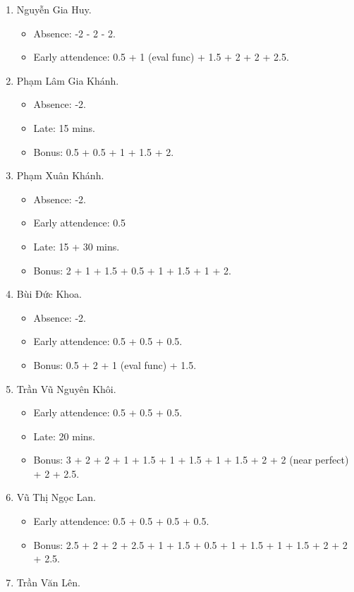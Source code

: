 \documentclass{article}
\begin{document}
\begin{enumerate}
\begin{itemize}
	\end{itemize}
	\item {\sc Nguyễn Gia Huy.}
	\begin{itemize}
		\item Absence: -2 - 2 - 2.
		\item Early attendence: 0.5 + 1 (eval func) + 1.5 + 2 + 2 + 2.5.
	\end{itemize}
	\item {\sc Phạm Lâm Gia Khánh.}
	\begin{itemize}
		\item Absence: -2.
		\item Late: 15 mins.
		\item Bonus: 0.5 + 0.5 + 1 + 1.5 + 2.
	\end{itemize}
	\item {\sc Phạm Xuân Khánh.}
	\begin{itemize}
		\item Absence: -2.
		\item Early attendence: 0.5
		\item Late: 15 + 30 mins.
		\item Bonus: 2 + 1 + 1.5 + 0.5 + 1 + 1.5 + 1 + 2.
	\end{itemize}
	\item {\sc Bùi Đức Khoa.}
	\begin{itemize}
		\item Absence: -2.
		\item Early attendence: 0.5 + 0.5 + 0.5.
		\item Bonus: 0.5 + 2 + 1 (eval func) + 1.5.
	\end{itemize}
	\item {\sc Trần Vũ Nguyên Khôi.}
	\begin{itemize}
		\item Early attendence: 0.5 + 0.5 + 0.5.
		\item Late: 20 mins.
		\item Bonus: 3 + 2 + 2 + 1 + 1.5 + 1 + 1.5 + 1 + 1.5 + 2 + 2 (near perfect) + 2 + 2.5.
	\end{itemize}
	\item {\sc Vũ Thị Ngọc Lan.}
	\begin{itemize}
		\item Early attendence: 0.5 + 0.5 + 0.5 + 0.5.
		\item Bonus: 2.5 + 2 + 2 + 2.5 + 1 + 1.5 + 0.5 + 1 + 1.5 + 1 + 1.5 + 2 + 2 + 2.5.
	\end{itemize}
	\item {\sc Trần Văn Lên.}

\end{enumerate}
\end{document}

